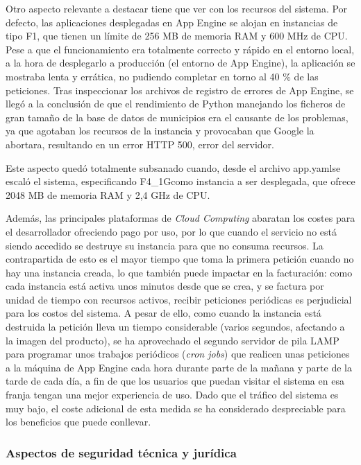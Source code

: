 Otro aspecto relevante a destacar tiene que ver con los recursos del sistema. Por defecto, las aplicaciones desplegadas en App Engine se alojan en instancias de tipo \guillemotleft F1\guillemotright, que tienen un límite de 256 MB de memoria RAM y 600 MHz de CPU. Pese a que el funcionamiento era totalmente correcto y rápido en el entorno local, a la hora de desplegarlo a producción (el entorno de App Engine), la aplicación se mostraba lenta y errática, no pudiendo completar en torno al 40 \% de las peticiones. Tras inspeccionar los archivos de registro de errores de App Engine, se llegó a la conclusión de que el rendimiento de Python manejando los ficheros de gran tamaño de la base de datos de municipios era el causante de los problemas, ya que agotaban los recursos de la instancia y provocaban que Google la abortara, resultando en un error HTTP 500, error del servidor.

Este aspecto quedó totalmente subsanado cuando, desde el archivo \guillemotleft app.yaml\guillemotright\space se escaló el sistema, especificando \guillemotleft F4\_1G\guillemotright\space como instancia a ser desplegada, que ofrece 2048 MB de memoria RAM y 2,4 GHz de CPU.

Además, las principales plataformas de \textit{Cloud Computing} abaratan los costes para el desarrollador ofreciendo pago por uso, por lo que cuando el servicio no está siendo accedido se destruye su instancia para que no consuma recursos. La contrapartida de esto es el mayor tiempo que toma la primera petición cuando no hay una instancia creada, lo que también puede impactar en la facturación: como cada instancia está activa unos minutos desde que se crea, y se factura por unidad de tiempo con recursos activos, recibir peticiones periódicas es perjudicial para los costos del sistema. A pesar de ello, como cuando la instancia está destruida la petición lleva un tiempo considerable (varios segundos, afectando a la imagen del producto), se ha aprovechado el segundo servidor de pila LAMP para programar unos trabajos periódicos (\textit{cron jobs}) que realicen unas peticiones a la máquina de App Engine cada hora durante parte de la mañana y parte de la tarde de cada día, a fin de que los usuarios que puedan visitar el sistema en esa franja tengan una mejor experiencia de uso. Dado que el tráfico del sistema es muy bajo, el coste adicional de esta medida se ha considerado despreciable para los beneficios que puede conllevar.

\subsubsection{Aspectos de seguridad técnica y jurídica}


